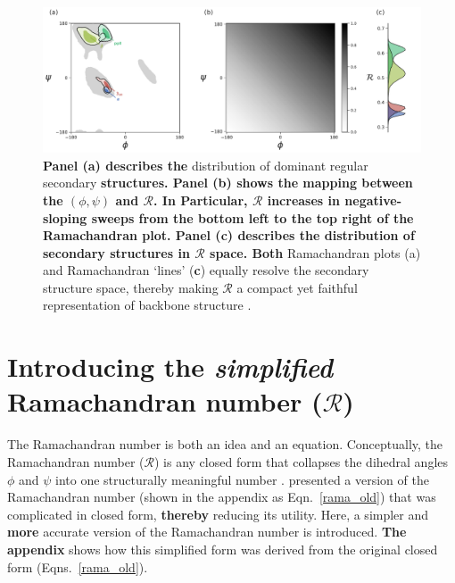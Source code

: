 \documentclass[fleqn,10pt,lineno]{wlpeerj} %
\newcommand{\Eqn}[1]{Eqn.~\ref{#1}}
\newcommand{\Eqns}[1]{Eqns.~\ref{#1}}
\newcommand{\n}[1]{{\textbf{\color{red}#1}}}
\newcommand{\rr}{$\mathcal{R}$\xspace}
\begin{document}
\begin{figure}[t!]
\begin{adjustwidth}{-1in}{0in} %
\centering
\includegraphics[width=0.9\linewidth]{backmap_fig3.pdf}
\caption{\n{Panel (a) describes the } distribution of dominant regular secondary \n{structures. Panel (b) shows the mapping between the $(\phi,\psi)$ and \rr. In Particular, \rr increases in negative-sloping sweeps from the bottom left to the top right of the Ramachandran plot. Panel (c) describes the distribution of secondary structures in \rr space. Both} Ramachandran plots (a) and Ramachandran `lines' (\n{c}) equally resolve the secondary structure space, thereby making \rr a compact yet faithful representation of backbone structure \citep{Mannige2016}.\label{fig:ramasecondary}} 
\end{adjustwidth}
\end{figure}

\section*{Introducing the \textit{simplified} Ramachandran number ($\mathcal{R}$)}

The Ramachandran number is both an idea and an equation. Conceptually, 
the Ramachandran number ($\mathcal{R}$) is any closed form that 
collapses the dihedral angles $\phi$ and $\psi$ into one structurally 
meaningful number \citep{Mannige2016}. \cite{Mannige2016} presented a 
version of the Ramachandran number (shown in the appendix as \Eqn{rama_old}) that was complicated in closed form, \n{thereby} reducing its utility. Here, a simpler and \n{more} accurate version of the Ramachandran number is introduced. \n{The appendix} shows how this simplified form was derived from the original closed form (\Eqns{rama_old}).
\end{document}
